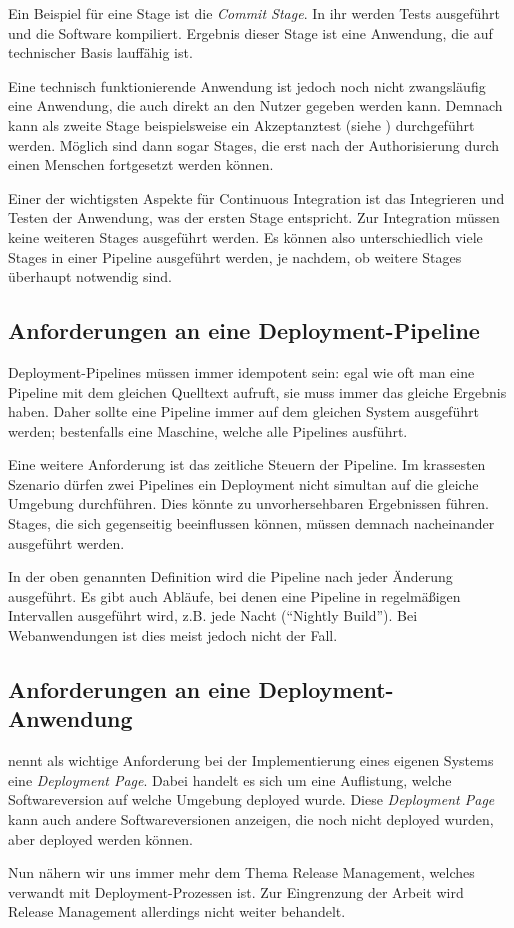Ein Beispiel für eine Stage ist die \emph{Commit Stage}. In ihr werden Tests ausgeführt und die Software kompiliert. Ergebnis dieser Stage ist eine Anwendung, die auf technischer Basis lauffähig ist. \citep[110]{Humble2010}

Eine technisch funktionierende Anwendung ist jedoch noch nicht zwangsläufig eine Anwendung, die auch direkt an den Nutzer gegeben werden kann. Demnach kann als zweite Stage beispielsweise ein Akzeptanztest (siehe ) durchgeführt werden. Möglich sind dann sogar Stages, die erst nach der Authorisierung durch einen Menschen fortgesetzt werden können. \citep{FowlerDP}

Einer der wichtigsten Aspekte für Continuous Integration ist das Integrieren und Testen der Anwendung, was der ersten Stage entspricht. Zur Integration müssen keine weiteren Stages ausgeführt werden. Es können also unterschiedlich viele Stages in einer Pipeline ausgeführt werden, je nachdem, ob weitere Stages überhaupt notwendig sind.

\subsection{Anforderungen an eine Deployment-Pipeline}

Deployment-Pipelines müssen immer idempotent sein: egal wie oft man eine Pipeline mit dem gleichen Quelltext aufruft, sie muss immer das gleiche Ergebnis haben. Daher sollte eine Pipeline immer auf dem gleichen System ausgeführt werden; bestenfalls eine Maschine, welche alle Pipelines ausführt. \citep[155]{Humble2010}

Eine weitere Anforderung ist das zeitliche Steuern der Pipeline. Im krassesten Szenario dürfen zwei Pipelines ein Deployment nicht simultan auf die gleiche Umgebung durchführen. Dies könnte zu unvorhersehbaren Ergebnissen führen. Stages, die sich gegenseitig beeinflussen können, müssen demnach nacheinander ausgeführt werden. \citep[119]{Humble2010}

In der oben genannten Definition wird die Pipeline nach jeder Änderung ausgeführt. Es gibt auch Abläufe, bei denen eine Pipeline in regelmäßigen Intervallen ausgeführt wird, z.B. jede Nacht (``Nightly Build''). Bei Webanwendungen ist dies meist jedoch nicht der Fall.

\subsection{Anforderungen an eine Deployment-Anwendung}

\citet[127]{Humble2010} nennt als wichtige Anforderung bei der Implementierung eines eigenen Systems eine \emph{Deployment Page}. Dabei handelt es sich um eine Auflistung, welche Softwareversion auf welche Umgebung deployed wurde. Diese \emph{Deployment Page} kann auch andere Softwareversionen anzeigen, die noch nicht deployed wurden, aber deployed werden können.

Nun nähern wir uns immer mehr dem Thema Release Management, welches verwandt mit Deployment-Prozessen ist. Zur Eingrenzung der Arbeit wird Release Management allerdings nicht weiter behandelt.
